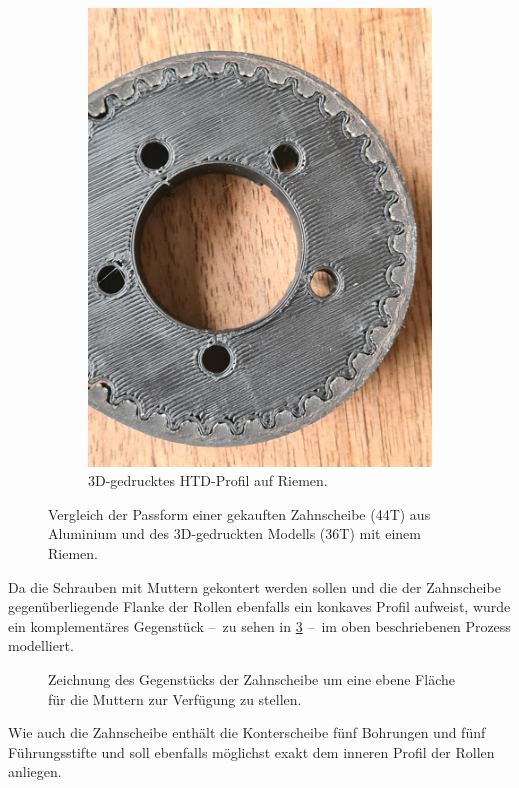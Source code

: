 \begin{figure}[h]
\begin{subfigure}{.49\textwidth}
				\includegraphics[width=\textwidth]{Footage/Pictures/Printed-HTD_tooth_fit.jpg}
				\caption{3D-gedrucktes HTD-Profil auf Riemen.}%
				\label{subfig:printed HTD}
			\end{subfigure}
			\caption{Vergleich der Passform einer gekauften Zahnscheibe (44T) aus Aluminium und des 3D-gedruckten Modells (36T) mit einem Riemen.}%
			\label{fig:HTD profiles comparison}
		\end{figure}\par\medskip
		Da die Schrauben mit Muttern gekontert werden sollen und die der Zahnscheibe gegenüberliegende Flanke der Rollen ebenfalls ein konkaves Profil aufweist, wurde ein komplementäres Gegenstück --~zu sehen in \cref{fig:orangatang kegel flat face} --~im oben beschriebenen Prozess modelliert.
		\begin{figure}[h]
			\centering
			
			\caption[Zeichnung des Gegenstücks der Zahnscheibe]{Zeichnung des Gegenstücks der Zahnscheibe um eine ebene Fläche für die Muttern zur Verfügung zu stellen.}%
			\label{fig:orangatang kegel flat face}
		\end{figure}
		Wie auch die Zahnscheibe enthält die Konterscheibe fünf Bohrungen und fünf Führungsstifte und soll ebenfalls möglichst exakt dem inneren Profil der Rollen anliegen.
		
